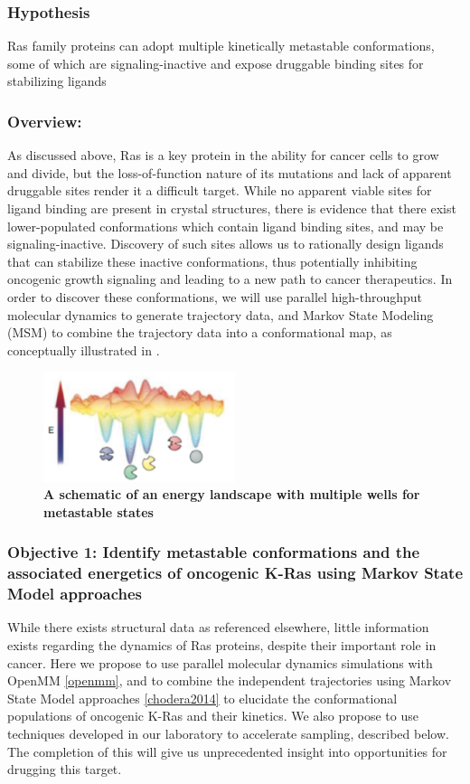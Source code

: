 \documentclass[12pt]{article}
\begin{document}
  \subsubsection*{Hypothesis}
  Ras family proteins can adopt multiple kinetically metastable conformations, some of which are signaling-inactive and expose druggable binding sites for stabilizing ligands
  \subsubsection*{Overview:}
  As discussed above, Ras is a key protein in the ability for cancer cells to grow and divide, but the loss-of-function nature of its mutations and lack of apparent druggable sites render it a difficult target. While no apparent viable sites for ligand binding are present in crystal structures, there is evidence that there exist lower-populated conformations \cite{fesik} \cite{ostrem2013} which contain ligand binding sites, and may be signaling-inactive. Discovery of such sites allows us to rationally design ligands that can stabilize these inactive conformations, thus potentially inhibiting oncogenic growth signaling and leading to a new path to cancer therapeutics. In order to discover these conformations, we will use parallel high-throughput molecular dynamics to generate trajectory data, and Markov State Modeling (MSM) \cite{chodera2014} to combine the trajectory data into a conformational map, as conceptually illustrated in .
  
    \begin{figure}[H]
  \centering
  \includegraphics[width=0.5\textwidth]{craik.png}
  \caption{\textbf{A schematic of an energy landscape with multiple wells for metastable states} \cite{craik}}
  \label{craikfig}
  \end{figure}
  
  \subsubsection*{Objective 1: Identify metastable conformations and the associated energetics of oncogenic K-Ras using Markov State Model approaches}
  While there exists structural data as referenced elsewhere, little information exists regarding the dynamics of Ras proteins, despite their important role in cancer. Here we propose to use parallel molecular dynamics simulations with OpenMM \cref{openmm}, and to combine the independent trajectories using Markov State Model approaches \cref{chodera2014} to elucidate the conformational populations of oncogenic K-Ras and their kinetics. We also propose to use techniques developed in our laboratory to accelerate sampling, described below. The completion of this will give us unprecedented insight into opportunities for drugging this target.
  
\end{document}

